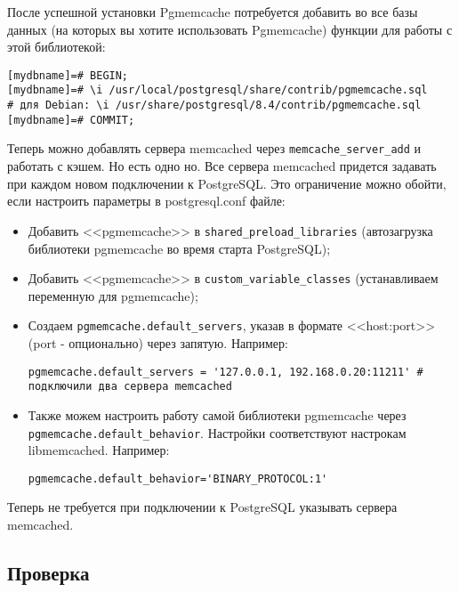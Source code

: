 После успешной установки Pgmemcache потребуется добавить во все базы данных (на которых вы хотите использовать Pgmemcache) функции для работы с этой библиотекой:

\begin{lstlisting}[label=lst:pgcache5,caption=Настройка]
% psql [mydbname] [pguser]
[mydbname]=# BEGIN;
[mydbname]=# \i /usr/local/postgresql/share/contrib/pgmemcache.sql
# для Debian: \i /usr/share/postgresql/8.4/contrib/pgmemcache.sql
[mydbname]=# COMMIT;
\end{lstlisting}

Теперь можно добавлять сервера memcached через \lstinline!memcache_server_add! и работать с кэшем. Но есть одно но. Все сервера memcached придется задавать при каждом новом подключении к PostgreSQL. Это ограничение можно обойти, если настроить параметры в postgresql.conf файле:

\begin{itemize}
  \item Добавить <<pgmemcache>> в \lstinline!shared_preload_libraries! (автозагрузка библиотеки pgmemcache во время старта PostgreSQL);
  \item Добавить <<pgmemcache>> в \lstinline!custom_variable_classes! (устанавливаем переменную для pgmemcache);
  \item Создаем \lstinline!pgmemcache.default_servers!, указав в формате <<host:port>> (port - опционально) через запятую. Например:

\begin{lstlisting}[label=lst:pgcache6,caption=Настройка default\_servers]
pgmemcache.default_servers = '127.0.0.1, 192.168.0.20:11211' # подключили два сервера memcached
\end{lstlisting}

\item Также можем настроить работу самой библиотеки pgmemcache через \lstinline!pgmemcache.default_behavior!. Настройки соответствуют настрокам libmemcached. Например:

\begin{lstlisting}[label=lst:pgcache7,caption=Настройка pgmemcache]
pgmemcache.default_behavior='BINARY_PROTOCOL:1'
\end{lstlisting}

\end{itemize}

Теперь не требуется при подключении к PostgreSQL указывать сервера memcached.

\subsection{Проверка}

